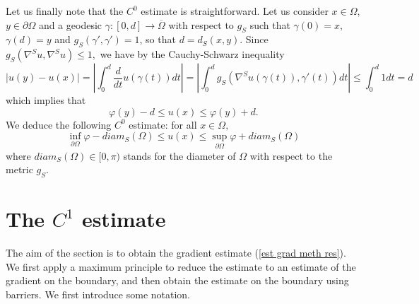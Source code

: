 \documentclass[10pt,reqno,oneside]{amsart}
\theoremstyle{definition}
\theoremstyle{remark}
\begin{document}
Let us finally note that the $C^0$ estimate is straightforward. Let us consider $x\in\Omega,$ $y\in\partial\Omega$ and a geodesic $\gamma:[0,d]\rightarrow\overline{\Omega}$ with respect to $g_S$ such that $\gamma(0)=x,$ $\gamma(d)=y
$ and $g_S(\gamma',\gamma')=1$, so that $d=d_S(x,y)$. Since $g_S(\nabla^Su,\nabla^Su)\leq 1,$ we have by the Cauchy-Schwarz inequality
$$|u(y)-u(x)|=\left|\int_0^d\frac{d}{dt}u(\gamma(t))dt\right|=\left|\int_0^dg_S(\nabla^Su(\gamma(t)),\gamma'(t))dt\right|\leq \int_0^d1dt=d$$
which implies that
\begin{equation}\label{C0 u phi d}
\varphi(y)-d\leq u(x)\leq\varphi(y)+d.
\end{equation}
We deduce the following $C^0$ estimate: for all $x\in\Omega,$
$$\inf_{\partial\Omega}\varphi-diam_S(\Omega)\leq u(x)\leq \sup_{\partial\Omega}\varphi+diam_S(\Omega)$$
where $diam_S(\Omega)\in[0,\pi)$ stands for the diameter of $\Omega$ with respect to the metric $g_S.$
\section{The $C^1$ estimate}\label{section C1}
The aim of the section is to obtain the gradient estimate (\ref{est grad meth res}). We first apply a maximum principle to reduce the estimate to an estimate of the gradient on the boundary, and then obtain the estimate on the boundary using barriers. We first introduce some notation.
\end{document}
